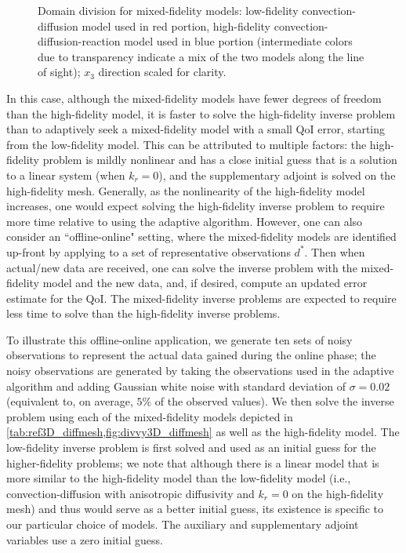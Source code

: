 \documentclass[review]{siamart0516}
\begin{document}
\begin{figure}[htbp]
{}
\caption{Domain division for mixed-fidelity models: low-fidelity convection-diffusion model used in red portion, high-fidelity convection-diffusion-reaction model used in blue portion (intermediate colors due to transparency indicate a mix of the two models along the line of sight); $x_3$ direction scaled for clarity.}
\label{fig:divvy3D_diffmesh}
\end{figure}
%

In this case, although the mixed-fidelity models have fewer degrees of freedom than the high-fidelity model, it is faster to solve the high-fidelity inverse problem than to adaptively seek a mixed-fidelity model with a small QoI error, starting from the low-fidelity model. This can be attributed to multiple factors: the high-fidelity problem is mildly nonlinear and has a close initial guess that is a solution to a linear system (when $k_r=0$), and the supplementary adjoint is solved on the high-fidelity mesh. Generally, as the nonlinearity of the high-fidelity model increases, one would expect solving the high-fidelity inverse problem to require more time relative to using the adaptive algorithm. However, one can also consider an ``offline-online" setting, where the mixed-fidelity models are identified up-front by applying  to a set of representative observations $d^*$. Then when actual/new data are received, one can solve the inverse problem with the mixed-fidelity model and the new data, and, if desired, compute an updated error estimate for the QoI. The mixed-fidelity inverse problems are expected to require less time to solve than the high-fidelity inverse problems.

To illustrate this offline-online application, we generate ten sets of noisy observations to represent the actual data gained during the online phase; the noisy observations are generated by taking the observations used in the adaptive algorithm and adding Gaussian white noise with standard deviation of $\sigma=0.02$ (equivalent to, on average, $5\%$ of the observed values). We then solve the inverse problem using each of the mixed-fidelity models depicted in \cref{tab:ref3D_diffmesh,fig:divvy3D_diffmesh} as well as the high-fidelity model. The low-fidelity inverse problem is first solved and used as an initial guess for the higher-fidelity problems; we note that although there is a linear model that is more similar to the high-fidelity model than the low-fidelity model (i.e., convection-diffusion with anisotropic diffusivity and $k_r=0$ on the high-fidelity mesh) and thus would serve as a better initial guess, its existence is specific to our particular choice of models. The auxiliary and supplementary adjoint variables use a zero initial guess.
\end{document}
